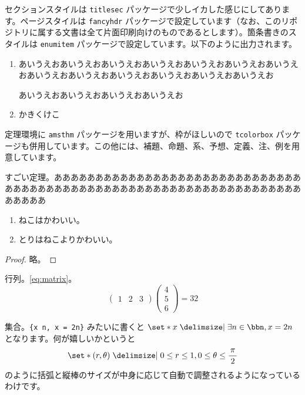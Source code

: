 \documentclass[a4paper]{ltjsarticle}
\begin{document}
セクションスタイルは \texttt{titlesec} パッケージで少しイカした感じにしてあります。ページスタイルは \texttt{fancyhdr} パッケージで設定しています（なお、このリポジトリに属する文書は全て片面印刷向けのものであるとします）。箇条書きのスタイルは \texttt{enumitem} パッケージで設定しています。以下のように出力されます。
\begin{enumerate}
  \item あいうえおあいうえおあいうえおあいうえおあいうえおあいうえおあいうえおあいうえおあいうえおあいうえおあいうえおあいうえおあいうえお

  あいうえおあいうえおあいうえおあいうえお
  \item かきくけこ
\end{enumerate}

定理環境に \texttt{amsthm} パッケージを用いますが、枠がほしいので \texttt{tcolorbox} パッケージも併用しています。この他には、補題、命題、系、予想、定義、注、例を用意しています。
\begin{thm}[ねこちゃんの定理]
  すごい定理。あああああああああああああああああああああああああああああああああああああああああああああああああああああああああああああああああああああああ
  \begin{enumerate}
    \item ねこはかわいい。
    \item とりはねこよりかわいい。
  \end{enumerate}
\end{thm}
\begin{proof}
  略。
\end{proof}

行列。\cref{eq:matrix}。
\begin{equation}\label{eq:matrix}
  {\begin{pmatrix}
    1 & 2 & 3
  \end{pmatrix}}{\begin{pmatrix}
    4 \\ 5 \\ 6
  \end{pmatrix}} = 32
\end{equation}

集合。\texttt{\string\set*\{x\string\given\string\exists\ n\string\in\string\bbn, x = 2n\}} みたいに書くと $\set*{x\given\exists n\in\bbn, x = 2n}$ となります。何が嬉しいかというと
\begin{equation}
  \set*{(r, \theta)\given 0\leq r\leq 1, 0\leq\theta\leq\sfrac{\pi}{2}}
\end{equation}
のように括弧と縦棒のサイズが中身に応じて自動で調整されるようになっているわけです。
\end{document}
